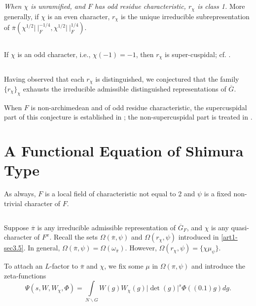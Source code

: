 \subsection{}\label{art1-sec4.3}
{\em When $\chi$ is unramified, and $F$ has odd residue characteristic, $r_{\chi}$ is class 1.} More generally, if $\chi$ is an even character, $r_{\chi}$ is the unique irreducible subrepresentation of $\overline{\pi}(\chi^{1/2}|~|^{-1/4}_{F},\chi^{1/2}|~|_{F}^{1/4})$.

\subsection{}\label{art1-sec4.4}\pageoriginale
If $\chi$ is an odd character, i.e., $\chi(-1)=-1$, then $r_{\chi}$ is super-cuspidal; cf. \cite{Ge}.

\subsection{}\label{art1-sec4.5}
Having observed that each $r_{\chi}$ is distinguished, we conjectured that the family $\{r_{\chi}\}_{\chi}$ exhausts the irreducible admissible distinguished representations of $\overline{G}$.

When $F$ is non-archimedean and of odd residue characteristic, the supercuspidal part of this conjecture is established in \cite{Meister}; the non-supercuspidal part is treated in \cite{Ge PS2}.

\section{A Functional Equation of Shimura Type}\label{art1-sec5}

As always, $F$ is a local field of characteristic not equal to 2 and $\psi$ is a fixed non-trivial character of $F$.

\subsection{}\label{art1-sec5.1}
Suppose $\overline{\pi}$ is any irreducible admissible representation of $\overline{G}_{F}$, and $\chi$ is any quasi-character of $F^{x}$. Recall the sets $\Omega(\overline{\pi},\psi)$ and $\Omega(r_{\chi},\psi)$ introduced in \eqref{art1-sec3.5}. In general, $\Omega(\overline{\pi},\psi)=\Omega(\omega_{\overline{\pi}})$. However, $\Omega(r_{\chi},\psi)=\{\chi \mu_{\psi}\}$.

To attach an $L$-factor to $\overline{\pi}$ and $\chi$, we fix some $\mu$ in $\Omega(\pi,\psi)$ and introduce the zeta-functions
\setcounter{equation}{0}
\begin{equation}
\Psi (s,W,W_{\chi},\Phi)=\int\limits_{N\backslash G} W(g)W_{\chi}(g)|\det (g)|^{s}\Phi((0.1)g)dg.\label{art1-eq5.1.1}
\end{equation}

